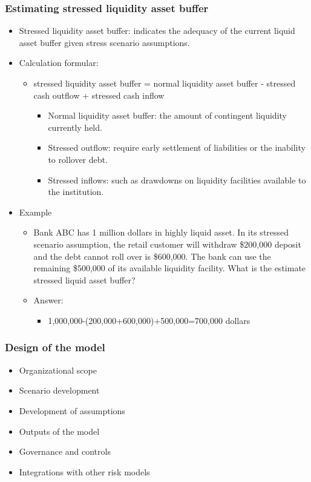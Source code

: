 \subsubsection{Estimating stressed liquidity asset buffer}
\begin{itemize}
\item Stressed liquidity asset buffer: indicates the adequacy of the current liquid asset buffer given stress scenario assumptions.
\item Calculation formular:
    \begin{itemize}
    \item stressed liquidity asset buffer = normal liquidity asset buffer - stressed cash outflow + stressed cash inflow
        \begin{itemize}
        \item Normal liquidity asset buffer: the amount of contingent liquidity currently held.
        \item Stressed outflow: require early settlement of liabilities or the inability to rollover debt.
        \item Stressed inflows: such as drawdowns on liquidity facilities available to the institution.
        \end{itemize}
        
    \end{itemize}
\item Example
    \begin{itemize}
    \item Bank ABC has 1 million dollars in highly liquid asset. In its stressed scenario assumption, the retail customer will withdraw \$200,000 deposit and the debt cannot roll over is \$600,000. The bank can use the remaining \$500,000 of its available liquidity facility. What is the estimate stressed liquid asset buffer?
    \item Answer:
        \begin{itemize}
        \item 1,000,000-(200,000+600,000)+500,000=700,000 dollars
        \end{itemize}
        
        
    \end{itemize}
    
    
\end{itemize}



\subsubsection{Design of the model}
\begin{itemize}
\item Organizational scope
\item Scenario development
\item Development of assumptions
\item Outputs of the model
\item Governance and controls
\item Integrations with other risk models
\end{itemize}



